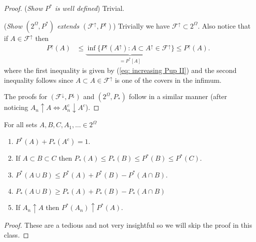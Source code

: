 \begin{proof}
({\sl Show $P^*$ is well defined}) Trivial.


({\sl Show $(2^\Omega, P^*)$ extends $(\mathcal F^\uparrow, P^\uparrow)$}) Trivially we have $\mathcal F^\uparrow \subset 2^\Omega$. Also notice that  if $A \in \mathcal F^\uparrow$ then
\begin{align*}
P^\uparrow(A) &\leq \underbrace{\inf\{P^\uparrow(A^\uparrow): A\subset A^\uparrow\in \mathcal F^\uparrow  \}}_{ = P^*[A]} \leq P^\uparrow(A).
\end{align*}
where the first inequality is given by (\ref{eq: increasing Pup II}) and the second inequality follows since $A\subset A\in \mathcal F^\uparrow$ is one of the covers in the infimum.

The proofs for $(\mathcal F^\downarrow, P^\downarrow)$ and $(2^\Omega, P_*)$ follow in a similar manner (after noticing $A_n\uparrow A \Longleftrightarrow A_n^c \downarrow A^c$).

\end{proof}


\begin{theorem}
\label{f5}
For all sets $A, B,C, A_1, \ldots\in 2^\Omega$
\begin{enumerate}
\item\label{eff1}  $P^* (A) + P_*(A^c) = 1$.
\item\label{eff2}  If $A\subset B\subset C$ then $P_* (A)\leq P_*(B)\leq P^*(B)\leq P^*(C)$.
\item\label{eff3}  $P^*(A\cup B)\leq P^*(A) + P^*(B) - P^*(A\cap B)$.
\item\label{eff4}  $P_*(A\cup B)\geq P_*(A) + P_*(B) - P_*(A\cap B)$
\item\label{eff6} If $ A_n \uparrow A$ then $P^*(A_n)\uparrow P^*(A)$.
\end{enumerate}
\end{theorem}
\begin{proof}
These are a tedious and not very insightful so we will skip the proof in this class.
\end{proof}



